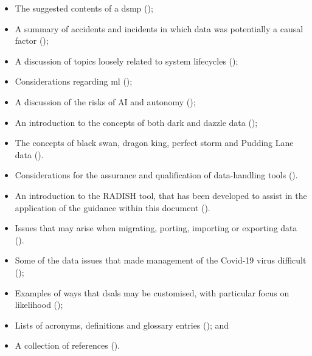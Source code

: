 \begin{itemize}
\begin{itemize}
		\item The suggested contents of a \gls{dsmp} ();
		\item A summary of accidents and incidents in which data was potentially a causal factor ();
		\item A discussion of topics loosely related to system lifecycles ();
		\item Considerations regarding \gls{ml} ();
		\item A discussion of the risks of AI and autonomy ();
		\item An introduction to the concepts of both dark and dazzle data ();
		\item The concepts of black swan, dragon king, perfect storm and Pudding Lane data ().
		\item Considerations for the assurance and qualification of data-handling tools ().
		\item An introduction to the RADISH tool, that has been developed to assist in the application of the guidance within this document ().
		\item Issues that may arise when migrating, porting, importing or exporting data ().            
		\item Some of the data issues that made management of the Covid-19 virus difficult ();
		\item Examples of ways that \glspl{dsal} may be customised, with particular focus on likelihood ();
		\item Lists of acronyms, definitions and glossary entries (); and
		\item A collection of references ().
	\end{itemize}
\cbend
\end{itemize}

%
%
\makeatletter		%
\dsiwg@intblankpage
\makeatother
\setcounter{tocdepth}{2}
\tableofcontents

%
%
\listoftables
%
\listoffigures
\cleardoublepage%
